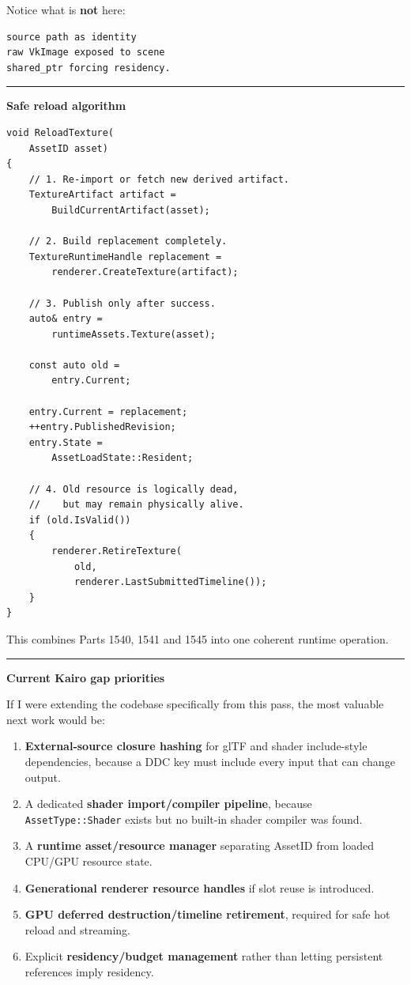Notice what is \textbf{not} here:

\begin{verbatim}
source path as identity
raw VkImage exposed to scene
shared_ptr forcing residency.
\end{verbatim}

\begin{center}\rule{0.5\linewidth}{0.5pt}\end{center}

\textbf{Safe reload algorithm}

\begin{verbatim}
void ReloadTexture(
    AssetID asset)
{
    // 1. Re-import or fetch new derived artifact.
    TextureArtifact artifact =
        BuildCurrentArtifact(asset);

    // 2. Build replacement completely.
    TextureRuntimeHandle replacement =
        renderer.CreateTexture(artifact);

    // 3. Publish only after success.
    auto& entry =
        runtimeAssets.Texture(asset);

    const auto old =
        entry.Current;

    entry.Current = replacement;
    ++entry.PublishedRevision;
    entry.State =
        AssetLoadState::Resident;

    // 4. Old resource is logically dead,
    //    but may remain physically alive.
    if (old.IsValid())
    {
        renderer.RetireTexture(
            old,
            renderer.LastSubmittedTimeline());
    }
}
\end{verbatim}

This combines Parts 1540, 1541 and 1545 into one coherent runtime operation.

\begin{center}\rule{0.5\linewidth}{0.5pt}\end{center}

\textbf{Current Kairo gap priorities}

If I were extending the codebase specifically from this pass, the most valuable next work would be:

\begin{enumerate}
\def\labelenumi{\arabic{enumi}.}
\item
  \textbf{External-source closure hashing} for glTF and shader include-style dependencies, because a DDC key must include every input that can change output.
\item
  A dedicated \textbf{shader import/compiler pipeline}, because \texttt{AssetType::Shader} exists but no built-in shader compiler was found.
\item
  A \textbf{runtime asset/resource manager} separating AssetID from loaded CPU/GPU resource state.
\item
  \textbf{Generational renderer resource handles} if slot reuse is introduced.
\item
  \textbf{GPU deferred destruction/timeline retirement}, required for safe hot reload and streaming.
\item
  Explicit \textbf{residency/budget management} rather than letting persistent references imply residency.
\end{enumerate}

